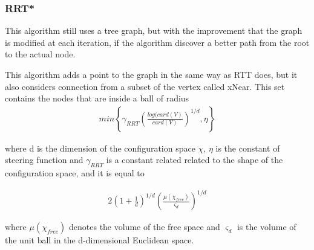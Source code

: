 \documentclass[10pt]{article}
\begin{document}
	\subsubsection{RRT*}
	
	This algorithm still uses a tree graph, but with the improvement that the graph is modified at each iteration, if the algorithm discover a better path from the root to the actual node.
	
	This algorithm adds a point to the graph in the same way as RTT does, but it also considers connection from a subset of the vertex called xNear. This set contains the nodes that are inside a ball of radius 
	\begin{align}
		 min\left\{\gamma_{RRT}\left(\frac{log(card(V)}{card(V)}\right)^{1/d},\eta\right\}
		\nonumber
	\end{align}
	
	where d is the dimension of the configuration space $\chi$, $\eta$ is the constant of steering function and $\gamma_{RRT}$ is a constant related related to the shape of the configuration space, and it is equal to
	
	\begin{align}
	2\left(1+\frac{1}{d}\right)^{1/d} \left(\frac{\mu(\chi_{free})}{\varsigma_{d}}\right)^{1/d}
	\nonumber
	\end{align}
	
	where  $\mu(\chi_{free})$ denotes the volume of the free space and $\varsigma_{d}$ is the volume of the unit ball in the d-dimensional 	Euclidean space.
	
\end{document}
